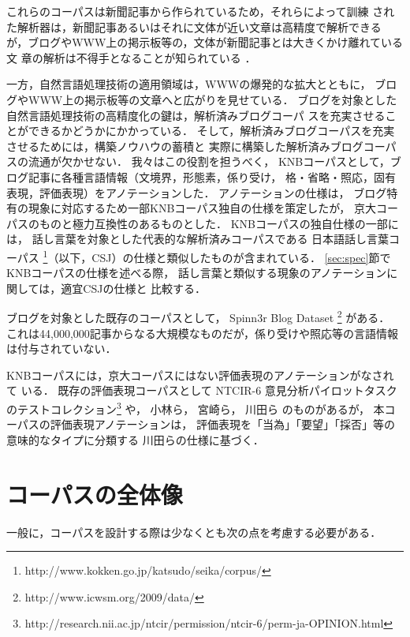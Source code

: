 \documentclass[japanese]{jnlp_JS2.0}
\begin{document}
これらのコーパスは新聞記事から作られているため，それらによって訓練
された解析器は，新聞記事あるいはそれに文体が近い文章は高精度で解析できる
が，ブログやWWW上の掲示板等の，文体が新聞記事とは大きくかけ離れている文
章の解析は不得手となることが知られている
\cite{McClosky:Charniak:Johnson:2006}．

一方，自然言語処理技術の適用領域は，WWWの爆発的な拡大とともに，
ブログやWWW上の掲示板等の文章へと広がりを見せている．
ブログを対象とした自然言語処理技術の高精度化の鍵は，解析済みブログコーパ
スを充実させることができるかどうかにかかっている．
そして，解析済みブログコーパスを充実させるためには，構築ノウハウの蓄積と
実際に構築した解析済みブログコーパスの流通が欠かせない．
我々はこの役割を担うべく，
KNBコーパスとして，ブログ記事に各種言語情報（文境界，形態素，係り受け，
格・省略・照応，固有表現，評価表現）をアノテーションした．
アノテーションの仕様は，
ブログ特有の現象に対応するため一部KNBコーパス独自の仕様を策定したが，
京大コーパスのものと極力互換性のあるものとした．
KNBコーパスの独自仕様の一部には，
話し言葉を対象とした代表的な解析済みコーパスである
日本語話し言葉コーパス
\cite{日本語話し言葉コーパスの構築法:2006}\footnote{
	http://www.kokken.go.jp/katsudo/seika/corpus/}（以下，CSJ）の仕様と類似したものが含まれている．
\ref{sec:spec}節でKNBコーパスの仕様を述べる際，
話し言葉と類似する現象のアノテーションに関しては，適宜CSJの仕様と
比較する．

ブログを対象とした既存のコーパスとして，
Spinn3r Blog Dataset
\cite{ICWSM:2009}\footnote{http://www.icwsm.org/2009/data/} がある．
これは44,000,000記事からなる大規模なものだが，係り受けや照応等の言語情報
は付与されていない．

KNBコーパスには，京大コーパスにはない評価表現のアノテーションがなされて
いる．
既存の評価表現コーパスとして
NTCIR-6 意見分析パイロットタスクのテストコレクション\footnote{
http://research.nii.ac.jp/ntcir/permission/ntcir-6/perm-ja-OPINION.html} や，
小林ら\cite{Kobayashi:Inui:Matsumoto:2007}，
宮崎ら\cite{宮崎:森:2008}，
川田ら\cite{評価情報タグ付与基準:2009}
のものがあるが，
本コーパスの評価表現アノテーションは，
評価表現を「当為」「要望」「採否」等の意味的なタイプに分類する
川田らの仕様に基づく．



\section{コーパスの全体像 \label{sec:spec}}

一般に，コーパスを設計する際は少なくとも次の点を考慮する必要がある．
\end{document}
